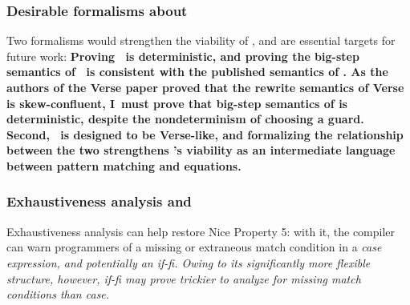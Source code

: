 \documentclass[manuscript,screen,review, 12pt, nonacm]{acmart}
\begin{document}
        \subsubsection{Desirable formalisms about \VMinus}
        Two formalisms would strengthen the viability of \VMinus, and are
        essential targets for future work: \bf{Proving \VMinus~is
        deterministic}, and \bf{proving the big-step semantics of \VMinus~is
        consistent with the published semantics of \VC.} As the authors of the
        Verse paper proved that the rewrite semantics of Verse is
        skew-confluent, I~must prove that big-step semantics of \VMinus is
        deterministic, despite the nondeterminism of choosing a guard. Second,
        \VMinus~is designed to be Verse-like, and formalizing the relationship
        between the two strengthens \VMinus's viability as an intermediate
        language between pattern matching and equations. 


        \subsubsection{Exhaustiveness analysis \PPlus and \VMinus}
        \label{typingppandvm}

        Exhaustiveness analysis can help restore Nice Property 5: with it,
        the compiler can warn programmers of a missing or extraneous match
        condition in a \it{case} expression, and potentially an \it{if-fi}.
        Owing to its significantly more flexible structure, however, \it{if-fi}
        may prove trickier to analyze for missing match conditions than
        \it{case}.


\end{document}
